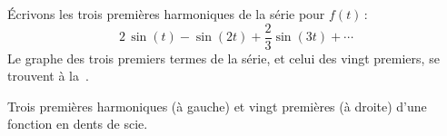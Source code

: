 \begin{example}
Écrivons les trois premières harmoniques de la série pour $f(t)$\,: 
\begin{equation*}
2 \, \sin (t)
- \sin (2t)
+\frac{2}{3} \sin (3t)
+ \cdots
\end{equation*}
Le graphe des trois premiers termes de la série, et celui des vingt premiers, se trouvent à la~.

\begin{myfig}
\capstart
\caption{Trois premières harmoniques (à gauche) et vingt premières (à droite) d'une fonction en dents de scie.\label{ts:sawtoothfsfig}}
\end{myfig}
\end{example}

